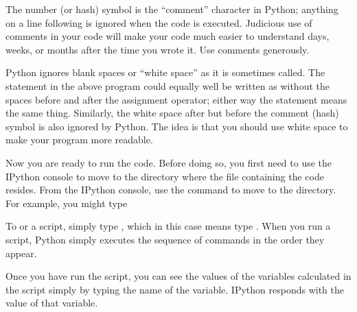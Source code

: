 \documentclass[letterpaper,10pt,english]{sphinxmanual}
\begin{document}
\sphinxAtStartPar
The number (or hash) symbol \sphinxcode{\sphinxupquote{\#}} is the “comment” character in Python; anything on a line following \sphinxcode{\sphinxupquote{\#}} is ignored when the code is executed.  Judicious use of comments in your code will make your code much easier to understand days, weeks, or months after the time you wrote it.  Use comments generously.

\sphinxAtStartPar
Python ignores blank spaces or “white space” as it is sometimes called. The statement  in the above program could equally well be written as  without the spaces before and after the \sphinxcode{\sphinxupquote{=}} assignment operator; either way the statement means the same thing.  Similarly, the white space after  but before the comment (hash) symbol is also ignored by Python.  The idea is that you should use white space to make your program more readable.

\sphinxAtStartPar
Now you are ready to run the code.  Before doing so, you first need to use the IPython console to move to the  directory where the file containing the code resides.  From the IPython console, use the  command to move to the  directory.  For example, you might type

\begin{sphinxVerbatim}[commandchars=\\\{\}]
 
\end{sphinxVerbatim}

\sphinxAtStartPar
To   or  a script, simply type  , which in this case means type .  When you run a script, Python simply executes the sequence of commands in the order they appear.

\begin{sphinxVerbatim}[commandchars=\\\{\}]
 
\end{sphinxVerbatim}

\sphinxAtStartPar
Once you have run the script, you can see the values of the variables calculated in the script simply by typing the name of the variable.  IPython responds with the value of that variable.
\end{document}
